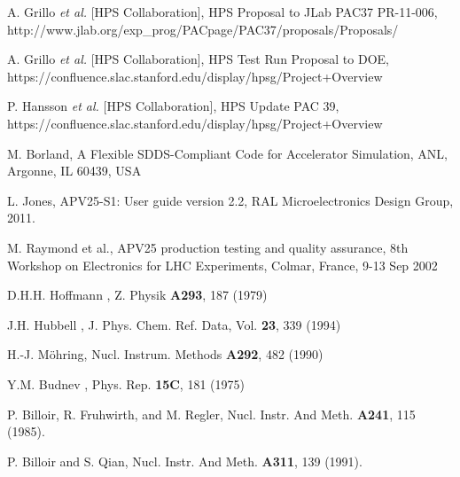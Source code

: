 \begin{thebibliography}{99}

 A. Grillo {\it et al.} [HPS Collaboration], HPS Proposal to JLab PAC37 PR-11-006,
 http://www.jlab.org/exp\_prog/PACpage/PAC37/proposals/Proposals/

 A. Grillo {\it et al.} [HPS Collaboration], HPS Test Run Proposal to DOE, 
https://confluence.slac.stanford.edu/display/hpsg/Project+Overview

 P. Hansson {\it et al.} [HPS Collaboration], HPS Update PAC 39, 
https://confluence.slac.stanford.edu/display/hpsg/Project+Overview



 
 M. Borland, A Flexible SDDS-Compliant Code for Accelerator Simulation, ANL, Argonne, IL 60439, USA
 
 
 L. Jones, APV25-S1: User guide version 2.2, RAL Microelectronics Design Group, 2011.

 M. Raymond et al., APV25 production testing and quality assurance, 8th Workshop on Electronics for LHC
	              Experiments, Colmar, France, 9-13 Sep 2002

%
D.H.H. Hoffmann \etal, Z. Physik {\bf A293}, 187 (1979)

J.H. Hubbell \etal, J. Phys. Chem. Ref. Data, Vol. {\bf 23}, 339 (1994) 

 H.-J. M\"{o}hring, Nucl. Instrum. Methods {\bf A292}, 482 (1990)

 Y.M. Budnev \etal, Phys. Rep. {\bf 15C}, 181 (1975)

P. Billoir, R. Fruhwirth, and M. Regler, Nucl. Instr. And Meth. {\bf A241}, 115 (1985). 

P. Billoir and S. Qian, Nucl. Instr. And Meth. {\bf A311}, 139 (1991). 



	               
\end{thebibliography} 